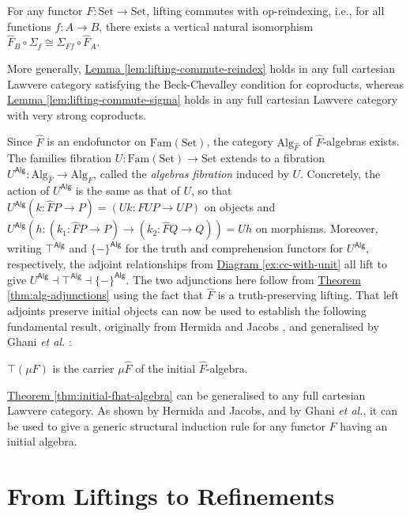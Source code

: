 \documentclass{LMCS}
\newcommand{\Fam}{\mathrm{Fam}}
\newcommand{\Set}{\mathrm{Set}}
\newcommand{\Alg}{\mathrm{Alg}}
\newcommand{\palg}{U^{\mathsf{Alg}}}
\newcommand{\truthalg}{\top^{\mathsf{Alg}}}
\newcommand{\compralg}[1]{\{#1\}^{\mathsf{Alg}}}
\newcommand{\lemref}[1]{\hyperref[#1]{Lemma \ref*{#1}}}
\newcommand{\thmref}[1]{\hyperref[#1]{Theorem \ref*{#1}}}
\begin{document}
\begin{lem}\label{lem:lifting-commute-sigma}
  For any functor $F : \Set \to \Set$, lifting commutes with
  op-reindexing, i.e., for all functions $f : A \to B$, there exists a
  vertical natural isomorphism $\hat{F}_B \circ \Sigma_f \cong
  \Sigma_{Ff} \circ \hat{F}_A$.
\end{lem}
\noindent
More generally, \lemref{lem:lifting-commute-reindex} holds in any full
cartesian Lawvere category satisfying the Beck-Chevalley condition for
coproducts, whereas \lemref{lem:lifting-commute-sigma} holds in any
full cartesian Lawvere category with very strong coproducts.

Since $\hat{F}$ is an endofunctor on $\Fam(\Set)$, the category
$\Alg_{\hat{F}}$ of $\hat{F}$-algebras exists. The families fibration
$U : \Fam(\Set) \to \Set$ extends to a fibration $\palg :
\Alg_{\hat{F}} \to \Alg_F$, called the {\em algebras fibration}
induced by $U$. Concretely, the action of $\palg$ is the same as that
of $U$, so that $\palg (k : \hat{F}P \to P) = (Uk : FUP \to UP)$ on
objects and $\palg (h : (k_1 : \hat{F}P \to P) \to (k_2 : \hat{F}Q \to
Q)) = Uh$ on morphisms.  Moreover, writing $\truthalg{}$ and
$\compralg{-}$ for the truth and comprehension functors for $\palg$,
respectively, the adjoint relationships from
\hyperref[ex:cc-with-unit]{Diagram \ref*{ex:cc-with-unit}} all lift to
give $\palg \dashv \truthalg{} \dashv \compralg{-}$.  The two
adjunctions here follow from \thmref{thm:alg-adjunctions} using the
fact that $\hat{F}$ is a truth-preserving lifting. That left adjoints
preserve initial objects can now be used to establish the following
fundamental result, originally from Hermida and Jacobs
\cite{hermida98structural}, and generalised by Ghani \emph{et al.}
\cite{ghani10induction}:
\begin{thm}\label{thm:initial-fhat-algebra}
  $\top(\mu F)$ is the carrier $\mu \hat{F}$ of the initial
  $\hat{F}$-algebra.
\end{thm}
\noindent
\thmref{thm:initial-fhat-algebra} can be generalised to any full
cartesian Lawvere category.  As shown by Hermida and Jacobs, and by
Ghani \emph{et al.}, it can be used to give a generic structural
induction rule for any functor $F$ having an initial algebra.

\section{From Liftings to Refinements}\label{sec:refining-inductive}
\end{document}
